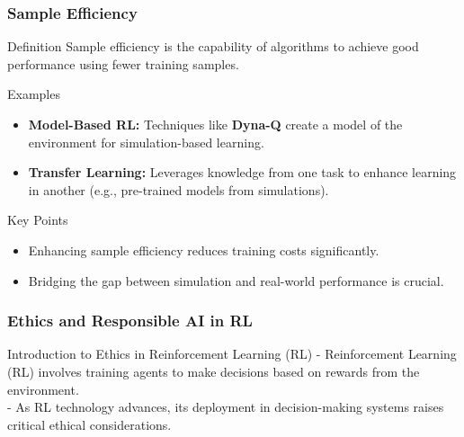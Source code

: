 \documentclass{beamer}
\begin{document}
\begin{frame}[fragile]
    \frametitle{Sample Efficiency}
    \begin{block}{Definition}
        Sample efficiency is the capability of algorithms to achieve good performance using fewer training samples.
    \end{block}
    
    \begin{block}{Examples}
        \begin{itemize}
            \item \textbf{Model-Based RL:} 
            Techniques like \textbf{Dyna-Q} create a model of the environment for simulation-based learning.
            \item \textbf{Transfer Learning:} 
            Leverages knowledge from one task to enhance learning in another (e.g., pre-trained models from simulations).
        \end{itemize}
    \end{block}
    
    \begin{block}{Key Points}
        \begin{itemize}
            \item Enhancing sample efficiency reduces training costs significantly.
            \item Bridging the gap between simulation and real-world performance is crucial.
        \end{itemize}
    \end{block}
\end{frame}

\begin{frame}[fragile]
    \frametitle{Ethics and Responsible AI in RL}
    \begin{block}{Introduction to Ethics in Reinforcement Learning (RL)}
        - Reinforcement Learning (RL) involves training agents to make decisions based on rewards from the environment.\\
        - As RL technology advances, its deployment in decision-making systems raises critical ethical considerations.
    \end{block}
\end{frame}
\end{document}
